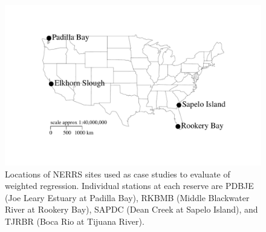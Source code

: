\documentclass[letterpaper,12pt,oneside]{article}\usepackage[]{graphicx}\usepackage[]{color}
\makeatletter
\def\maxwidth{ %
  \ifdim\Gin@nat@width>\linewidth
    \linewidth
  \else
    \Gin@nat@width
  \fi
}
\newenvironment{knitrout}{}{} %
\makeatother
\begin{document}
\centering\vspace*{\fill}
\begin{knitrout}
\color{fgcolor}\begin{figure}[!ht]


{\centering \includegraphics[width=\maxwidth]{figure/case_map} 

}

\caption[Locations of \ac{NERRS} sites used as case studies to evaluate of weighted regression]{Locations of \ac{NERRS} sites used as case studies to evaluate of weighted regression.  Individual stations at each reserve are PDBJE (Joe Leary Estuary at Padilla Bay), RKBMB (Middle Blackwater River at Rookery Bay), SAPDC (Dean Creek at Sapelo Island), and TJRBR (Boca Rio at Tijuana River).\label{fig:case_map}}
\end{figure}


\end{knitrout}
\vfill
\clearpage
\end{document}
